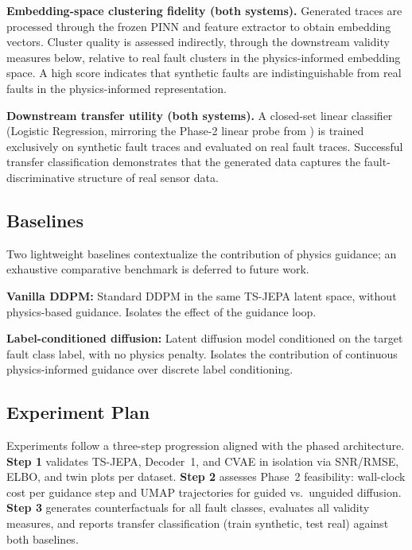 \documentclass[conference]{IEEEtran}
\begin{document}
\textbf{Embedding-space clustering fidelity (both systems).} Generated traces are processed through the frozen PINN and feature extractor to obtain embedding vectors. Cluster quality is assessed indirectly, through the downstream validity measures below, relative to real fault clusters in the physics-informed embedding space. A high score indicates that synthetic faults are indistinguishable from real faults in the physics-informed representation.

\textbf{Downstream transfer utility (both systems).} A closed-set linear classifier (Logistic Regression, mirroring the Phase-2 linear probe from \cite{spotorno2026linking}) is trained exclusively on synthetic fault traces and evaluated on real fault traces. Successful transfer classification demonstrates that the generated data captures the fault-discriminative structure of real sensor data.

\subsection{Baselines}

Two lightweight baselines contextualize the contribution of physics guidance; an exhaustive comparative benchmark is deferred to future work.

\textbf{Vanilla DDPM:} Standard DDPM in the same TS-JEPA latent space, without physics-based guidance. Isolates the effect of the guidance loop.

\textbf{Label-conditioned diffusion:} Latent diffusion model conditioned on the target fault class label, with no physics penalty. Isolates the contribution of continuous physics-informed guidance over discrete label conditioning.

\subsection{Experiment Plan}

Experiments follow a three-step progression aligned with the phased architecture. \textbf{Step 1} validates TS-JEPA, Decoder~1, and CVAE in isolation via SNR/RMSE, ELBO, and twin plots per dataset. \textbf{Step 2} assesses Phase~2 feasibility: wall-clock cost per guidance step and UMAP trajectories for guided vs.\ unguided diffusion. \textbf{Step 3} generates counterfactuals for all fault classes, evaluates all validity measures, and reports transfer classification (train synthetic, test real) against both baselines.
\end{document}

